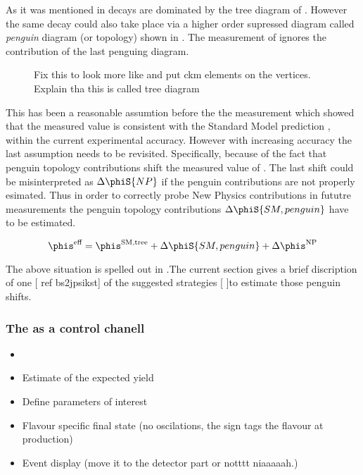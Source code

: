 As it was mentioned in  \BsJpsiPhi decays are dominated by the tree diagram of .
However the same decay could also take place via a higher order supressed diagram called {\it penguin} diagram (or topology)
shown in . The \phis measurement of  ignores the contribution of the last penguing diagram.

\begin{figure}[h]
  \centering
  {\sffamily }
  \caption{{\color{red} Fix this to look more like  and put ckm elements on the vertices}. Explain tha this is called tree diagram}
  \label{bs2jpsiphi_peng}
\end{figure}

\noindent This has been a reasonable assumtion before the the \lhcb measurement which showed that the measured  value is consistent with the Standard
Model prediction , within the current experimental accuracy. However with increasing accuracy the last assumption needs to be revisited.
Specifically, because of the fact that penguin topology contributions shift the measured value of .
The last shift could be misinterpreted as $\Delta\phiS{NP}$ if the penguin contributions are not properly esimated.
Thus in order to correctly probe New Physics contributions in fututre measurements the penguin topology contributions $\Delta\phiS{SM,penguin}$
have to be estimated.

\begin{equation}
\phis^{\text {eff}} = \phis^{\tiny \text{SM,tree}} + \Delta\phiS{SM, penguin} + \Delta\phis^{\tiny \text{NP}}
 \label{phis_sm_peng}
\end{equation}

\noindent The above situation is spelled out in .The current section gives a brief discription of
one [{\color{red} ref bs2jpsikst}] of the suggested strategies [{\color{red}{ref robs papers}} ]to estimate those penguin shifts.


\subsubsection{The \BsJpsiKst as a control chanell}

\begin{itemize}
  \item
\item Estimate of the expected yield
\item Define parameters of interest
\item Flavour specific final state (no oscilations, the sign tags the flavour at production)
\item Event display (move it to the detector part or notttt niaaaaah.)
\end{itemize}



